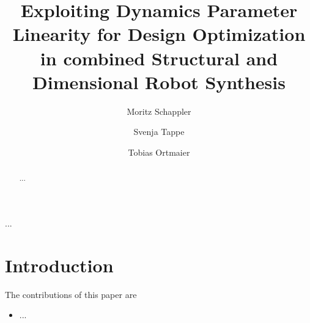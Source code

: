\documentclass{svproc}
\begin{document}
    
\mainmatter              %
%
\title{Exploiting Dynamics Parameter Linearity for Design Optimization in combined Structural and Dimensional Robot Synthesis}
%
%
\author{Moritz Schappler \and Svenja Tappe \and Tobias Ortmaier}
%
%
%

\maketitle              %


\begin{abstract}
...
\end{abstract}

\begin{keywords}
...
\end{keywords}

\section{Introduction}
\label{sec:Intro}





The contributions of this paper are
\begin{itemize}
    \item ...
\end{itemize}
\end{document}
